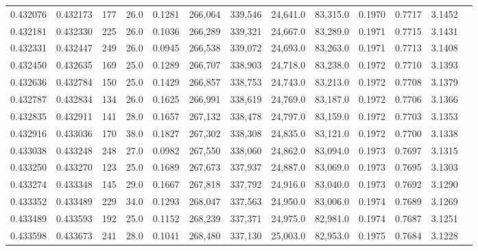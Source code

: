 \begin{tabular}{rrrrrrrrrrrrr}
0.432076 & 0.432173 &   177 & 26.0 &                                     0.1281 & 266,064 & 339,546 &  24,641.0 &  83,315.0 & 0.1970 & 0.7717 & 3.1452 \\
0.432181 & 0.432330 &   225 & 26.0 &                                     0.1036 & 266,289 & 339,321 &  24,667.0 &  83,289.0 & 0.1971 & 0.7715 & 3.1431 \\
0.432331 & 0.432447 &   249 & 26.0 &                                     0.0945 & 266,538 & 339,072 &  24,693.0 &  83,263.0 & 0.1971 & 0.7713 & 3.1408 \\
0.432450 & 0.432635 &   169 & 25.0 &                                     0.1289 & 266,707 & 338,903 &  24,718.0 &  83,238.0 & 0.1972 & 0.7710 & 3.1393 \\
0.432636 & 0.432784 &   150 & 25.0 &                                     0.1429 & 266,857 & 338,753 &  24,743.0 &  83,213.0 & 0.1972 & 0.7708 & 3.1379 \\
0.432787 & 0.432834 &   134 & 26.0 &                                     0.1625 & 266,991 & 338,619 &  24,769.0 &  83,187.0 & 0.1972 & 0.7706 & 3.1366 \\
0.432835 & 0.432911 &   141 & 28.0 &                                     0.1657 & 267,132 & 338,478 &  24,797.0 &  83,159.0 & 0.1972 & 0.7703 & 3.1353 \\
0.432916 & 0.433036 &   170 & 38.0 &                                     0.1827 & 267,302 & 338,308 &  24,835.0 &  83,121.0 & 0.1972 & 0.7700 & 3.1338 \\
0.433038 & 0.433248 &   248 & 27.0 &                                     0.0982 & 267,550 & 338,060 &  24,862.0 &  83,094.0 & 0.1973 & 0.7697 & 3.1315 \\
0.433250 & 0.433270 &   123 & 25.0 &                                     0.1689 & 267,673 & 337,937 &  24,887.0 &  83,069.0 & 0.1973 & 0.7695 & 3.1303 \\
0.433274 & 0.433348 &   145 & 29.0 &                                     0.1667 & 267,818 & 337,792 &  24,916.0 &  83,040.0 & 0.1973 & 0.7692 & 3.1290 \\
0.433352 & 0.433489 &   229 & 34.0 &                                     0.1293 & 268,047 & 337,563 &  24,950.0 &  83,006.0 & 0.1974 & 0.7689 & 3.1269 \\
0.433489 & 0.433593 &   192 & 25.0 &                                     0.1152 & 268,239 & 337,371 &  24,975.0 &  82,981.0 & 0.1974 & 0.7687 & 3.1251 \\
0.433598 & 0.433673 &   241 & 28.0 &                                     0.1041 & 268,480 & 337,130 &  25,003.0 &  82,953.0 & 0.1975 & 0.7684 & 3.1228 \\

\end{tabular}

